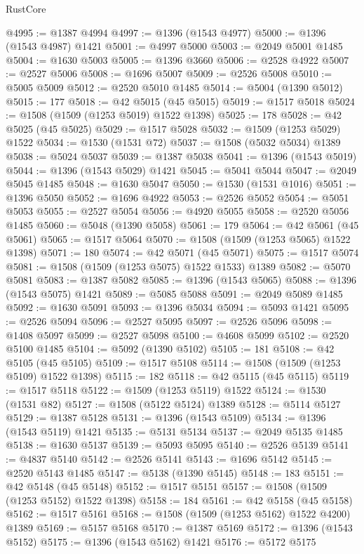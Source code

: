 \begin{lexlean}{RustCore}
\begin{coremodule}
@4995 := @1387 @4994
@4997 := @1396 (@1543 @4977)
@5000 := @1396 (@1543 @4987) @1421
@5001 := @4997 @5000
@5003 := @2049 @5001 @1485
@5004 := @1630 @5003
@5005 := @1396 @3660
@5006 := @2528 @4922
@5007 := @2527 @5006
@5008 := @1696 @5007
@5009 := @2526 @5008
@5010 := @5005 @5009
@5012 := @2520 @5010 @1485
@5014 := @5004 (@1390 @5012)
@5015 := 177
@5018 := @42 @5015 (@45 @5015)
@5019 := @1517 @5018
@5024 := @1508 (@1509 (@1253 @5019) @1522 @1398)
@5025 := 178
@5028 := @42 @5025 (@45 @5025)
@5029 := @1517 @5028
@5032 := @1509 (@1253 @5029) @1522
@5034 := @1530 (@1531 @72)
@5037 := @1508 (@5032 @5034) @1389
@5038 := @5024 @5037
@5039 := @1387 @5038
@5041 := @1396 (@1543 @5019)
@5044 := @1396 (@1543 @5029) @1421
@5045 := @5041 @5044
@5047 := @2049 @5045 @1485
@5048 := @1630 @5047
@5050 := @1530 (@1531 @1016)
@5051 := @1396 @5050
@5052 := @1696 @4922
@5053 := @2526 @5052
@5054 := @5051 @5053
@5055 := @2527 @5054
@5056 := @4920 @5055
@5058 := @2520 @5056 @1485
@5060 := @5048 (@1390 @5058)
@5061 := 179
@5064 := @42 @5061 (@45 @5061)
@5065 := @1517 @5064
@5070 := @1508 (@1509 (@1253 @5065) @1522 @1398)
@5071 := 180
@5074 := @42 @5071 (@45 @5071)
@5075 := @1517 @5074
@5081 := @1508 (@1509 (@1253 @5075) @1522 @1533) @1389
@5082 := @5070 @5081
@5083 := @1387 @5082
@5085 := @1396 (@1543 @5065)
@5088 := @1396 (@1543 @5075) @1421
@5089 := @5085 @5088
@5091 := @2049 @5089 @1485
@5092 := @1630 @5091
@5093 := @1396 @5034
@5094 := @5093 @1421
@5095 := @2526 @5094
@5096 := @2527 @5095
@5097 := @2526 @5096
@5098 := @1408 @5097
@5099 := @2527 @5098
@5100 := @4608 @5099
@5102 := @2520 @5100 @1485
@5104 := @5092 (@1390 @5102)
@5105 := 181
@5108 := @42 @5105 (@45 @5105)
@5109 := @1517 @5108
@5114 := @1508 (@1509 (@1253 @5109) @1522 @1398)
@5115 := 182
@5118 := @42 @5115 (@45 @5115)
@5119 := @1517 @5118
@5122 := @1509 (@1253 @5119) @1522
@5124 := @1530 (@1531 @82)
@5127 := @1508 (@5122 @5124) @1389
@5128 := @5114 @5127
@5129 := @1387 @5128
@5131 := @1396 (@1543 @5109)
@5134 := @1396 (@1543 @5119) @1421
@5135 := @5131 @5134
@5137 := @2049 @5135 @1485
@5138 := @1630 @5137
@5139 := @5093 @5095
@5140 := @2526 @5139
@5141 := @4837 @5140
@5142 := @2526 @5141
@5143 := @1696 @5142
@5145 := @2520 @5143 @1485
@5147 := @5138 (@1390 @5145)
@5148 := 183
@5151 := @42 @5148 (@45 @5148)
@5152 := @1517 @5151
@5157 := @1508 (@1509 (@1253 @5152) @1522 @1398)
@5158 := 184
@5161 := @42 @5158 (@45 @5158)
@5162 := @1517 @5161
@5168 := @1508 (@1509 (@1253 @5162) @1522 @4200) @1389
@5169 := @5157 @5168
@5170 := @1387 @5169
@5172 := @1396 (@1543 @5152)
@5175 := @1396 (@1543 @5162) @1421
@5176 := @5172 @5175

\end{coremodule}
\end{lexlean}
